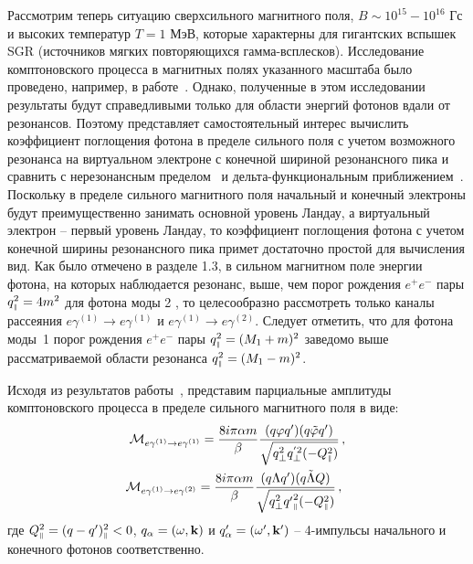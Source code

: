 Рассмотрим теперь ситуацию сверхсильного магнитного поля, \mbox{$B\sim 
10^{15}-10^{16}$} Гс и высоких температур $T=1$ МэВ, которые характерны для 
гигантских вспышек SGR (источников мягких повторяющихся гамма-всплесков).  
Исследование комптоновского процесса в магнитных полях указанного масштаба было 
проведено, например, в работе~\cite{Chistyakov:2009}. Однако, полученные в этом 
исследовании результаты будут справедливыми только для области энергий фотонов 
вдали от резонансов. Поэтому представляет самостоятельный интерес вычислить 
коэффициент поглощения фотона в пределе сильного поля с учетом возможного 
резонанса на виртуальном электроне с конечной шириной резонансного пика и 
сравнить с нерезонансным пределом~\cite{Chistyakov:2009} и 
дельта-функциональным приближением~\cite{Rumyantsev:2017}. Поскольку в пределе 
сильного магнитного поля начальный и конечный электроны будут преимущественно 
занимать основной уровень Ландау, а виртуальный электрон -- первый уровень 
Ландау, то коэффициент поглощения фотона с учетом конечной ширины резонансного 
пика примет достаточно простой для вычисления вид. Как было отмечено в разделе 
1.3, в сильном магнитном поле энергии фотона, на которых наблюдается резонанс, 
выше, чем порог рождения $e^+e^-$ пары $q_{\mbox{\tiny $\|$}}^2=4m^2$ для фотона моды 2 , 
то целесообразно рассмотреть только каналы рассеяния $e\gamma^{(1)}\to 
e\gamma^{(1)}$ и $e\gamma^{(1)}\to e\gamma^{(2)}$. Следует отметить, что для 
фотона моды~1 порог рождения $e^+e^-$ пары $q_{\mbox{\tiny $\|$}}^2=(M_1+m)^2$ заведомо 
выше рассматриваемой области резонанса $q_{\mbox{\tiny $\|$}}^2=(M_1-m)^2$.

Исходя из результатов работы~\cite{Chistyakov:2009}, представим парциальные амплитуды комптоновского процесса в пределе сильного магнитного поля в виде:
\begin{equation}\begin{gathered}\label{amplnonres}
		{\cal M}_{e\gamma^{(1)}\to e\gamma^{(1)}}=\frac{8i\pi\alpha m}{\beta}\frac{(q\varphi q')(q\tilde{\varphi}q')}{\sqrt{q^2_\perp q^{'2}_\perp (-Q^2_{\mbox{\tiny $\|$}})}}\, ,\\
		{\cal M}_{e\gamma^{(1)}\to e\gamma^{(2)}}=\frac{8i \pi\alpha m}{\beta}\frac{(q\Lambda q')(q\tilde{\Lambda} Q)}{\sqrt{q^2_\perp {q'}^2_{\mbox{\tiny $\|$}}(-Q^2_{\mbox{\tiny $\|$}})}}\, ,\hspace{2mm} 
\end{gathered}\end{equation}
где   
$Q^2_{\mbox{\tiny $\|$}} = (q - q')^2_{\mbox{\tiny $\|$}} <0$,
$q_{\alpha} = (\omega,{\bf k})$ и $q'_{\alpha} = (\omega',{\bf k'})$
-- 4-импульсы начального и конечного фотонов соответственно.

